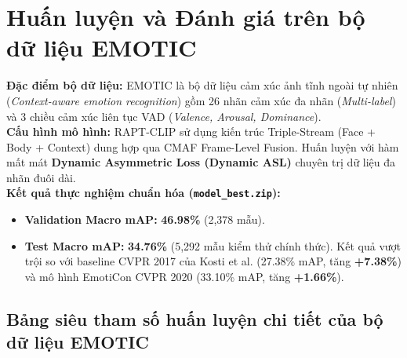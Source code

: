 \documentclass[10pt,a4paper]{article}
\begin{document}
\section{Huấn luyện và Đánh giá trên bộ dữ liệu EMOTIC}

\noindent\textbf{Đặc điểm bộ dữ liệu:} EMOTIC là bộ dữ liệu cảm xúc ảnh tĩnh ngoài tự nhiên (\textit{Context-aware emotion recognition}) gồm 26 nhãn cảm xúc đa nhãn (\textit{Multi-label}) và 3 chiều cảm xúc liên tục VAD (\textit{Valence, Arousal, Dominance}).\\
\textbf{Cấu hình mô hình:} RAPT-CLIP sử dụng kiến trúc Triple-Stream (Face + Body + Context) dung hợp qua CMAF Frame-Level Fusion. Huấn luyện với hàm mất mát \textbf{Dynamic Asymmetric Loss (Dynamic ASL)} chuyên trị dữ liệu đa nhãn đuôi dài.\\
\textbf{Kết quả thực nghiệm chuẩn hóa (\texttt{model\_best.zip}):}
\begin{itemize}[leftmargin=18pt, itemsep=1pt]
    \item \textbf{Validation Macro mAP:} \textbf{46.98\%} (2,378 mẫu).
    \item \textbf{Test Macro mAP:} \textbf{34.76\%} (5,292 mẫu kiểm thử chính thức). Kết quả vượt trội so với baseline CVPR 2017 của Kosti et al. (27.38\% mAP, tăng \textbf{+7.38\%}) và mô hình EmotiCon CVPR 2020 (33.10\% mAP, tăng \textbf{+1.66\%}).
\end{itemize}

\subsection{Bảng siêu tham số huấn luyện chi tiết của bộ dữ liệu EMOTIC}
\end{document}
